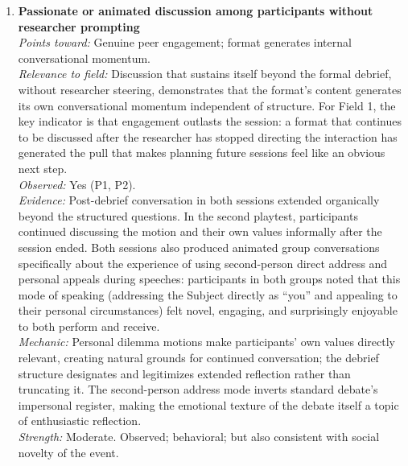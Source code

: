 \begin{enumerate}
\item \textbf{Passionate or animated discussion among participants without researcher prompting}\\
\textit{Points toward:} Genuine peer engagement; format generates internal conversational momentum.\\
\textit{Relevance to field:} Discussion that sustains itself beyond the formal debrief, without researcher steering, demonstrates that the format's content generates its own conversational momentum independent of structure. For Field 1, the key indicator is that engagement outlasts the session: a format that continues to be discussed after the researcher has stopped directing the interaction has generated the pull that makes planning future sessions feel like an obvious next step.\\
\textit{Observed:} Yes (P1, P2).\\
\textit{Evidence:} Post-debrief conversation in both sessions extended organically beyond the structured questions. In the second playtest, participants continued discussing the motion and their own values informally after the session ended. Both sessions also produced animated group conversations specifically about the experience of using second-person direct address and personal appeals during speeches: participants in both groups noted that this mode of speaking (addressing the Subject directly as ``you'' and appealing to their personal circumstances) felt novel, engaging, and surprisingly enjoyable to both perform and receive.\\
\textit{Mechanic:} Personal dilemma motions make participants' own values directly relevant, creating natural grounds for continued conversation; the debrief structure designates and legitimizes extended reflection rather than truncating it. The second-person address mode inverts standard debate's impersonal register, making the emotional texture of the debate itself a topic of enthusiastic reflection.\\
\textit{Strength:} Moderate. Observed; behavioral; but also consistent with social novelty of the event.


\end{enumerate}
